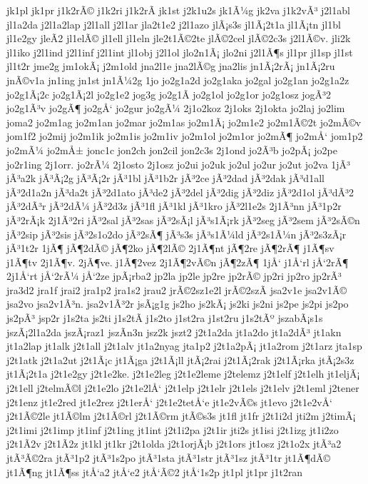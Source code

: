 {jk1pl
jk1pr
j1k2rÃ©
j1k2ri
j1k2rÃ­
jk1st
j2k1u2s
jk1Ã¼g
jk2va
j1k2vÃ³
j2l1abl
jl1a2da
j2l1a2lap
j2l1all
j2l1ar
jla2t1e2
j2l1azo
jlÃ¡s3s
jl1Ã¡2t1a
jl1Ã¡tn
jl1bl
jl1e2gy
jleÃ­2
jl1elÃ©
jl1ell
jl1eln
jle2t1Ã©2te
jlÃ©2cel
jlÃ©2c3s
j2l1Ã©v.
jli2k
jl1iko
j2l1ind
j2l1inf
j2l1int
jl1obj
j2l1ol
jlo2n1Ã¡
jlo2ni
j2l1Ã¶s
jl1pr
jl1sp
jl1st
jl1t2r
jme2g
jm1okÃ¡
j2m1old
jna2l1e
jna2lÃ©g
jna2lis
jn1Ã¡2rÃ¡
jn1Ã¡2ru
jnÃ©v1a
jn1ing
jn1st
jn1Ã¼2g
1jo
jo2g1a2d
jo2g1aka
jo2gal
jo2g1an
jo2g1a2z
jo2g1Ã¡2c
jo2g1Ã¡2l
jo2g1e2
jog3g
jo2g1Ã­
jo2g1ol
jo2g1or
jo2g1osz
jogÃ³2
jo2g1Ã³v
jo2gÃ¶
jo2gÅ‘
jo2gur
jo2gÃ¼
2j1o2koz
2j1oks
2j1okta
jo2laj
jo2lim
joma2
jo2m1ag
jo2m1an
jo2mar
jo2m1as
jo2m1Ã¡
jo2m1e2
jo2m1Ã©2t
jo2mÃ©v
jom1f2
jo2mij
jo2m1ik
jo2m1is
jo2m1iv
jo2m1ol
jo2m1or
jo2mÃ¶
jo2mÅ‘
jom1p2
jo2mÃ¼
jo2mÅ±
jonc1c
jon2ch
jon2cil
jon2c3s
2j1ond
jo2Ã³b
jo2pÃ¡
jo2pe
jo2r1ing
2j1orr.
jo2rÃ¼
2j1osto
2j1osz
jo2ui
jo2uk
jo2ul
jo2ur
jo2ut
jo2va
1jÃ³
jÃ³a2k
jÃ³Ã¡2g
jÃ³Ã¡2r
jÃ³1bl
jÃ³1b2r
jÃ³2ce
jÃ³2dad
jÃ³2dak
jÃ³d1all
jÃ³2d1a2n
jÃ³da2t
jÃ³2d1ato
jÃ³de2
jÃ³2del
jÃ³2dig
jÃ³2diz
jÃ³2d1ol
jÃ³dÃ³2
jÃ³2dÃ³r
jÃ³2dÃ¼
jÃ³2d3z
jÃ³1fl
jÃ³1kl
jÃ³1kro
jÃ³2l1e2s
2j1Ã³nn
jÃ³1p2r
jÃ³2rÃ¡k
2j1Ã³2ri
jÃ³2sal
jÃ³2sas
jÃ³2sÃ¡l
jÃ³s1Ã¡rk
jÃ³2seg
jÃ³2sem
jÃ³2sÃ©n
jÃ³2sip
jÃ³2sis
jÃ³2s1o2do
jÃ³2sÃ¶
jÃ³s3s
jÃ³s1Ã¼ld
jÃ³2s1Ã¼n
jÃ³2s3zÃ¡r
jÃ³1t2r
1jÃ¶
jÃ¶2dÃ©
jÃ¶2ko
jÃ¶2lÃ©
2j1Ã¶nt
jÃ¶2re
jÃ¶2rÃ¶
j1Ã¶sv
j1Ã¶tv
2j1Ã¶v.
2jÃ¶ve.
j1Ã¶2vez
2j1Ã¶2vÃ©n
jÃ¶2zÃ¶
1jÅ‘
j1Å‘rl
jÅ‘2rÃ¶
2j1Å‘rt
jÅ‘2rÃ¼
jÅ‘2ze
jpÃ¡rba2
jp2la
jp2le
jp2re
jp2rÃ©
jp2ri
jp2ro
jp2rÃ³
jra3d2
jra1f
jrai2
jra1p2
jra1s2
jrau2
jrÃ©2sz1e2l
jrÃ©2szÃ­
jsa2v1e
jsa2v1Ã©
jsa2vo
jsa2v1Ã³n.
jsa2v1Ã³2r
jsÃ¡g1g
js2ho
js2kÃ¡
js2ki
js2ni
js2pe
js2pi
js2po
js2pÃ³
jsp2r
j1s2ta
js2ti
j1s2tÃ­
j1s2to
j1st2ra
j1st2ru
j1s2tÃº
jszabÃ¡s1s
jszÃ¡2l1a2da
jszÃ¡raz1
jszÃ­n3n
jsz2k
jszt2
j2t1a2da
jt1a2do
jt1a2dÃ³
jt1akn
jt1a2lap
jt1alk
j2t1all
j2t1alv
jt1a2nyag
jta1p2
j2t1a2pÃ¡
jt1a2rom
j2t1arz
jta1sp
j2t1atk
j2t1a2ut
j2t1Ã¡c
jt1Ã¡ga
j2t1Ã¡ll
jtÃ¡2rai
j2t1Ã¡2rak
j2t1Ã¡rka
jtÃ¡2s3z
jt1Ã¡2t1a
j2t1e2gy
j2t1e2ke.
j2t1e2leg
j2t1e2leme
j2telemz
j2t1elf
j2t1elh
jt1eljÃ¡
j2t1ell
j2telmÃ©l
j2t1e2lo
j2t1e2lÅ‘
j2t1elp
j2t1elr
j2t1els
j2t1elv
j2t1eml
j2tener
j2t1enz
jt1e2red
jt1e2rez
j2t1erÅ‘
j2t1e2tetÅ‘e
jt1e2vÃ©s
jt1evo
j2t1e2vÅ‘
j2t1Ã©2le
jt1Ã©lm
j2t1Ã©rl
j2t1Ã©rm
jtÃ©s3s
jt1fl
jt1fr
j2t1i2d
jti2m
j2timÃ¡
j2t1imi
j2t1imp
jt1inf
j2t1ing
jt1int
j2t1i2pa
j2t1ir
jti2s
jt1isi
j2t1izg
jt1i2zo
j2t1Ã­2v
j2t1Ã­2z
jt1kl
jt1kr
j2t1olda
j2t1orjÃ¡b
j2t1ors
jt1osz
j2t1o2x
jtÃ³a2
jtÃ³Ã©2ra
jtÃ³1p2
jtÃ³1s2po
jtÃ³1sta
jtÃ³1str
jtÃ³1sz
jtÃ³1tr
jt1Ã¶dÃ©
jt1Ã¶ng
jt1Ã¶ss
jtÅ‘a2
jtÅ‘e2
jtÅ‘Ã©2
jtÅ‘1s2p
jt1pl
jt1pr
j1t2ran
}
